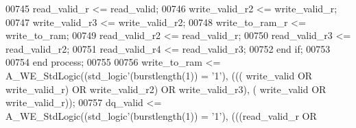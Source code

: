 \begin{DoxyCode}
00745       \textcolor{vhdlchar}{read_valid_r} \textcolor{vhdlchar}{<=} \textcolor{vhdlchar}{read_valid};
00746       \textcolor{vhdlchar}{write_valid_r2} \textcolor{vhdlchar}{<=} \textcolor{vhdlchar}{write_valid_r};
00747       \textcolor{vhdlchar}{write_valid_r3} \textcolor{vhdlchar}{<=} \textcolor{vhdlchar}{write_valid_r2};
00748       \textcolor{vhdlchar}{write_to_ram_r} \textcolor{vhdlchar}{<=} \textcolor{vhdlchar}{write_to_ram};
00749       \textcolor{vhdlchar}{read_valid_r2} \textcolor{vhdlchar}{<=} \textcolor{vhdlchar}{read_valid_r};
00750       \textcolor{vhdlchar}{read_valid_r3} \textcolor{vhdlchar}{<=} \textcolor{vhdlchar}{read_valid_r2};
00751       \textcolor{vhdlchar}{read_valid_r4} \textcolor{vhdlchar}{<=} \textcolor{vhdlchar}{read_valid_r3};
00752     \textcolor{keywordflow}{end} \textcolor{keywordflow}{if};
00753 
00754   \textcolor{keywordflow}{end} \textcolor{keywordflow}{process};
00755 
00756   \textcolor{vhdlchar}{write_to_ram} \textcolor{vhdlchar}{<=} \textcolor{vhdlchar}{A\_WE\_StdLogic}\textcolor{vhdlchar}{(}\textcolor{vhdlchar}{(}\textcolor{comment}{std\_logic}\textcolor{vhdlchar}{'}\textcolor{vhdlchar}{(}\textcolor{vhdlchar}{burstlength}\textcolor{vhdlchar}{(}\textcolor{vhdllogic}{}\textcolor{vhdllogic}{1}\textcolor{vhdlchar}{)}\textcolor{vhdlchar}{)} \textcolor{vhdlchar}{=} \textcolor{vhdlchar}{'}\textcolor{vhdllogic}{}\textcolor{vhdllogic}{1}\textcolor{vhdlchar}{'}\textcolor{vhdlchar}{)}\textcolor{vhdlchar}{,} \textcolor{vhdlchar}{(}\textcolor{vhdlchar}{(}\textcolor{vhdlchar}{(}\textcolor{vhdlchar}{
      write_valid} \textcolor{keywordflow}{OR} \textcolor{vhdlchar}{write_valid_r}\textcolor{vhdlchar}{)} \textcolor{keywordflow}{OR} \textcolor{vhdlchar}{write_valid_r2}\textcolor{vhdlchar}{)} \textcolor{keywordflow}{OR} \textcolor{vhdlchar}{write_valid_r3}\textcolor{vhdlchar}{)}\textcolor{vhdlchar}{,} \textcolor{vhdlchar}{(}\textcolor{vhdlchar}{
      write_valid} \textcolor{keywordflow}{OR} \textcolor{vhdlchar}{write_valid_r}\textcolor{vhdlchar}{)}\textcolor{vhdlchar}{)};
00757   \textcolor{vhdlchar}{dq_valid} \textcolor{vhdlchar}{<=} \textcolor{vhdlchar}{A\_WE\_StdLogic}\textcolor{vhdlchar}{(}\textcolor{vhdlchar}{(}\textcolor{comment}{std\_logic}\textcolor{vhdlchar}{'}\textcolor{vhdlchar}{(}\textcolor{vhdlchar}{burstlength}\textcolor{vhdlchar}{(}\textcolor{vhdllogic}{}\textcolor{vhdllogic}{1}\textcolor{vhdlchar}{)}\textcolor{vhdlchar}{)} \textcolor{vhdlchar}{=} \textcolor{vhdlchar}{'}\textcolor{vhdllogic}{}\textcolor{vhdllogic}{1}\textcolor{vhdlchar}{'}\textcolor{vhdlchar}{)}\textcolor{vhdlchar}{,} \textcolor{vhdlchar}{(}\textcolor{vhdlchar}{(}\textcolor{vhdlchar}{(}\textcolor{vhdlchar}{read_valid_r} \textcolor{keywordflow}{OR} \textcolor{vhdlchar}{
}
\end{DoxyCode}
